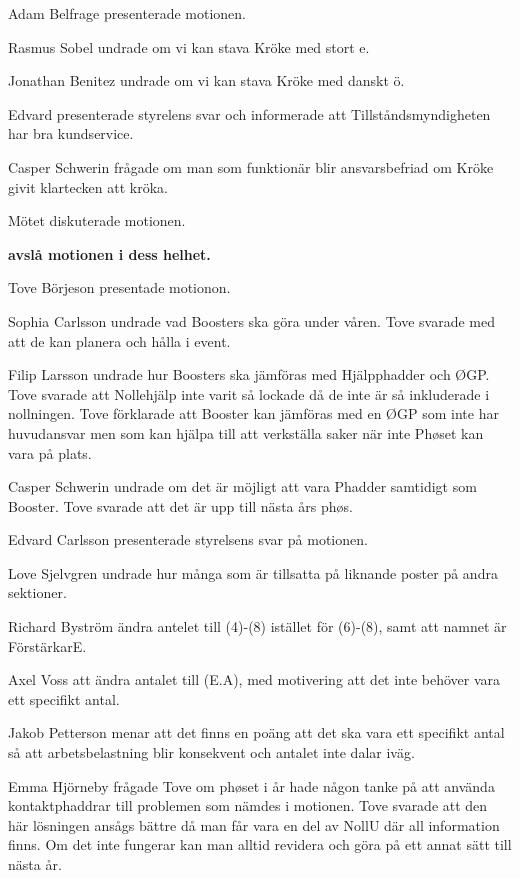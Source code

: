 \documentclass[10pt]{article}
\begin{document}
\begin{paragrafer}
\begin{paragrafer}

      Adam Belfrage presenterade motionen. 

      Rasmus Sobel undrade om vi kan stava Kröke med stort e.

      Jonathan Benitez undrade om vi kan stava Kröke med danskt ö.

      Edvard presenterade styrelens svar och informerade att Tillståndsmyndigheten har bra kundservice.

      Casper Schwerin frågade om man som funktionär blir ansvarsbefriad om Kröke givit klartecken att kröka. 

      Mötet diskuterade motionen.  

      \textbf{\Mba avslå motionen i dess helhet. }


      Tove Börjeson presentade motionon. 

      Sophia Carlsson undrade vad Boosters ska göra under våren. Tove svarade med att de kan planera och hålla i event. 

      Filip Larsson undrade hur Boosters ska jämföras med Hjälpphadder och ØGP. Tove svarade att Nollehjälp inte varit så lockade då de inte är så inkluderade i nollningen. Tove förklarade att Booster kan jämföras med en ØGP som inte har huvudansvar men som kan hjälpa till att verkställa saker när inte Phøset kan vara på plats. 

      Casper Schwerin undrade om det är möjligt att vara Phadder samtidigt som Booster. Tove svarade att det är upp till nästa års phøs.
      


      Edvard Carlsson presenterade styrelsens svar på motionen. 
      
      Love Sjelvgren undrade hur många som är tillsatta på liknande poster på andra sektioner. 

      Richard Byström \ypa ändra antelet till (4)-(8) istället för (6)-(8), samt att namnet är FörstärkarE.

      Axel Voss \ypa att ändra antalet till (E.A), med motivering att det inte behöver vara ett specifikt antal.
      
      Jakob Petterson menar att det finns en poäng att det ska vara ett specifikt antal så att arbetsbelastning blir konsekvent och antalet inte dalar iväg. 

      Emma Hjörneby frågade Tove om phøset i år hade någon tanke på att använda kontaktphaddrar till problemen som nämdes i motionen. Tove svarade att den här lösningen ansågs bättre då man får vara en del av NollU där all information finns. Om det inte fungerar kan man alltid revidera och göra på ett annat sätt till nästa år. 


\end{paragrafer}
\end{paragrafer}
\end{document}
